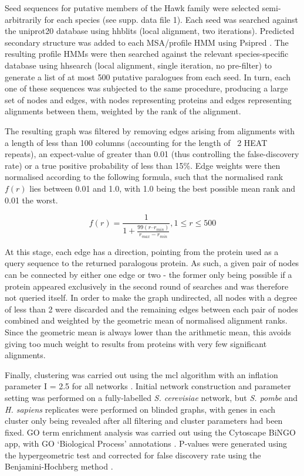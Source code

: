 \documentclass[a4paper,11pt,twoside,openright]{scrbook}
\begin{document}
Seed sequences for putative members of the Hawk family were selected semi-arbitrarily for each species (see supp. data file 1). Each seed was searched against the uniprot20 database using hhblits \cite{Remmert2011} (local alignment, two iterations). Predicted secondary structure was added to each MSA/profile HMM using Psipred \cite{Jones1999}. The resulting profile HMMs were then searched against the relevant species-specific database using hhsearch (local alignment, single iteration, no pre-filter) to generate a list of at most 500 putative paralogues from each seed. In turn, each one of these sequences was subjected to the same procedure, producing a large set of nodes and edges, with nodes representing proteins and edges representing alignments between them, weighted by the rank of the alignment.

The resulting graph was filtered by removing edges arising from alignments with a length of less than 100 columns (accounting for the length of ~2 HEAT repeats), an expect-value of greater than 0.01 (thus controlling the false-discovery rate) or a true positive probability of less than 15\%. Edge weights were then normalised according to the following formula, such that the normalised rank $f(r)$ lies between 0.01 and 1.0, with 1.0 being the best possible mean rank and 0.01 the worst.

\begin{displaymath}
    f(r) = \frac{1}{1 + \frac{99(r – r_{min} )}{r_{max} - r_{min}}}, 1 \leq r \leq 500
\end{displaymath}

At this stage, each edge has a direction, pointing from the protein used as a query sequence to the returned paralogous protein. As such, a given pair of nodes can be connected by either one edge or two - the former only being possible if a protein appeared exclusively in the second round of searches and was therefore not queried itself. In order to make the graph undirected, all nodes with a degree of less than 2 were discarded and the remaining edges between each pair of nodes combined and weighted by the geometric mean of normalised alignment ranks. Since the geometric mean is always lower than the arithmetic mean, this avoids giving too much weight to results from proteins with very few significant alignments.

Finally, clustering was carried out using the mcl algorithm with an inflation parameter I = 2.5 for all networks \cite{VanDongen2000}. Initial network construction and parameter setting was performed on a fully-labelled \textit{S. cerevisiae} network, but \textit{S. pombe} and \textit{H. sapiens} replicates were performed on blinded graphs, with genes in each cluster only being revealed after all filtering and cluster parameters had been fixed. GO term enrichment analysis was carried out using the Cytoscape BiNGO app, with GO `Biological Process' annotations \cite{Maere2005}. P-values were generated using the hypergeometric test and corrected for false discovery rate using the Benjamini-Hochberg method \cite{Benjamini1995,Maere2005}.
\end{document}
